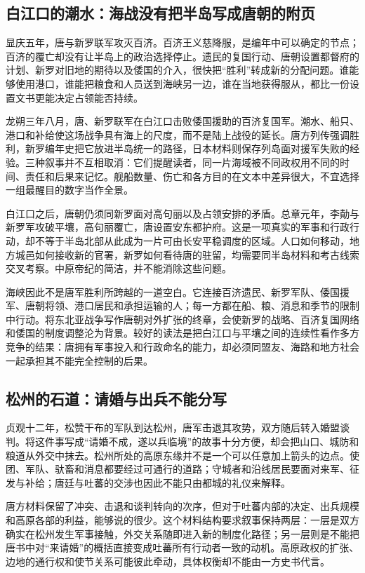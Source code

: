\subsection{白江口的潮水：海战没有把半岛写成唐朝的附页}
显庆五年，唐与新罗联军攻灭百济。百济王义慈降服，是编年中可以确定的节点；百济的覆亡却没有让半岛上的政治选择停止。遗民的复国行动、唐朝设置都督府的计划、新罗对旧地的期待以及倭国的介入，很快把“胜利”转成新的分配问题。谁能够使用港口，谁能把粮食和人员送到海峡另一边，谁在当地获得服从，都比一份设置文书更能决定占领能否持续。

龙朔三年八月，唐、新罗联军在白江口击败倭国援助的百济复国军。潮水、船只、港口和补给使这场战争具有海上的尺度，而不是陆上战役的延长。唐方列传强调胜利，新罗编年史把它放进半岛统一的路径，日本材料则保存列岛面对援军失败的经验。三种叙事并不互相取消：它们提醒读者，同一片海域被不同政权用不同的时间、责任和后果来记忆。舰船数量、伤亡和各方目的在文本中差异很大，不宜选择一组最醒目的数字当作全景。

白江口之后，唐朝仍须同新罗面对高句丽以及占领安排的矛盾。总章元年，李勣与新罗军攻破平壤，高句丽覆亡，唐设置安东都护府。这是一项真实的军事和行政行动，却不等于半岛北部从此成为一片可由长安平稳调度的区域。人口如何移动，地方城邑如何接收新的官署，新罗如何看待唐的驻留，均需要同半岛材料和考古线索交叉考察。中原帝纪的简洁，并不能消除这些问题。

海峡因此不是唐军胜利所跨越的一道空白。它连接百济遗民、新罗军队、倭国援军、唐朝将领、港口居民和承担运输的人；每一方都在船、粮、消息和季节的限制中行动。将东北亚战争写作唐朝对外扩张的终章，会使新罗的战略、百济复国网络和倭国的制度调整沦为背景。较好的读法是把白江口与平壤之间的连续性看作多方竞争的结果：唐拥有军事投入和行政命名的能力，却必须同盟友、海路和地方社会一起承担其不能完全控制的后果。

\subsection{松州的石道：请婚与出兵不能分写}
贞观十二年，松赞干布的军队到达松州，唐军击退其攻势，双方随后转入婚盟谈判。将这件事写成“请婚不成，遂以兵临境”的故事十分方便，却会把山口、城防和粮道从外交中抹去。松州所处的高原东缘并不是一个可以任意加上箭头的边点。使团、军队、驮畜和消息都要经过可通行的道路；守城者和沿线居民要面对来军、征发与补给；唐廷与吐蕃的交涉也因此不能只由都城的礼仪来解释。

唐方材料保留了冲突、击退和谈判转向的次序，但对于吐蕃内部的决定、出兵规模和高原各部的利益，能够说的很少。这个材料结构要求叙事保持两层：一层是双方确实在松州发生军事接触，外交关系随即进入新的制度化路径；另一层则是不能把唐书中对“来请婚”的概括直接变成吐蕃所有行动者一致的动机。高原政权的扩张、边地的通行权和使节关系可能彼此牵动，具体权衡却不能由一方史书代言。


